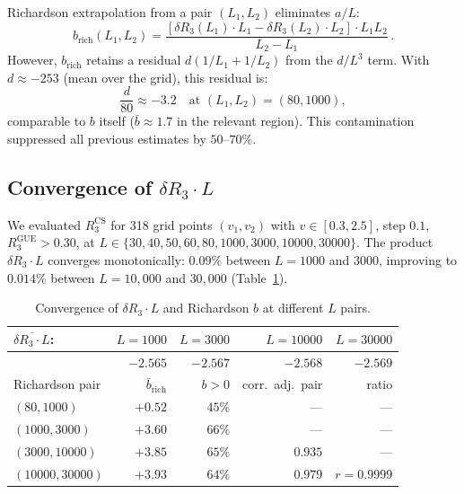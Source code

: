 \documentclass[11pt]{article}
\begin{document}
Richardson extrapolation from a pair $(L_1, L_2)$ eliminates $a/L$:
\begin{equation}
b_{\mathrm{rich}}(L_1, L_2) = \frac{[\delta R_3(L_1)\cdot L_1 - \delta R_3(L_2)\cdot L_2]
\cdot L_1 L_2}{L_2 - L_1}\,.
\label{eq:richardson}
\end{equation}
However, $b_{\mathrm{rich}}$ retains a residual $d(1/L_1 + 1/L_2)$ from the
$d/L^3$ term. With $d \approx -253$ (mean over the grid), this residual is:
\begin{equation}
\frac{d}{80} \approx -3.2 \quad \text{at } (L_1, L_2) = (80, 1000),
\end{equation}
comparable to $b$ itself ($\bar{b} \approx 1.7$ in the relevant region).
This contamination suppressed all previous estimates by $50$--$70\%$.

\subsection{Convergence of $\delta R_3 \cdot L$}

We evaluated $R_3^{\mathrm{CS}}$ for 318 grid points $(v_1, v_2)$ with
$v \in [0.3, 2.5]$, step $0.1$, $R_3^{\mathrm{GUE}} > 0.30$, at
$L \in \{30, 40, 50, 60, 80, 1000, 3000, 10000, 30000\}$. The product
$\delta R_3 \cdot L$ converges monotonically: $0.09\%$ between $L = 1000$
and $3000$, improving to $0.014\%$ between $L = 10{,}000$ and $30{,}000$
(Table~\ref{tab:convergence}).

\begin{table}[ht]
\centering
\caption{Convergence of $\delta R_3 \cdot L$ and Richardson $b$ at different $L$ pairs.}
\label{tab:convergence}
\begin{tabular}{lrrrr}
\toprule
$\overline{\delta R_3 \cdot L}$: & $L{=}1000$ & $L{=}3000$ & $L{=}10000$ & $L{=}30000$ \\
\midrule
 & $-2.565$ & $-2.567$ & $-2.568$ & $-2.569$ \\
\midrule
Richardson pair & $\bar{b}_{\mathrm{rich}}$ & $b > 0$ & corr.\ adj.\ pair & ratio \\
\midrule
$(80, 1000)$ & $+0.52$ & $45\%$ & --- & --- \\
$(1000, 3000)$ & $+3.60$ & $66\%$ & --- & --- \\
$(3000, 10000)$ & $+3.85$ & $65\%$ & $0.935$ & --- \\
$(10000, 30000)$ & $+3.93$ & $64\%$ & $0.979$ & $r = 0.9999$ \\
\bottomrule
\end{tabular}
\end{table}
\end{document}
